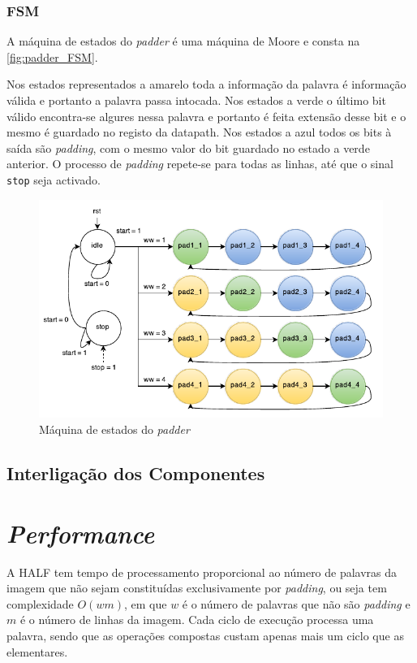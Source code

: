 \documentclass[a4paper]{article}
\begin{document}
\subsubsection{FSM}
A máquina de estados do \textit{padder} é uma máquina de Moore e consta na \autoref{fig:padder_FSM}.

Nos estados representados a amarelo toda a informação da palavra é informação válida e portanto a palavra passa intocada. Nos estados a verde o último bit válido encontra-se algures nessa palavra e portanto é feita extensão desse bit e o mesmo é guardado no registo da datapath. Nos estados a azul todos os bits à saída são \textit{padding}, com o mesmo valor do bit guardado no estado a verde anterior. O processo de \textit{padding} repete-se para todas as linhas, até que o sinal \texttt{stop} seja activado.

\begin{figure}[h]
	\centering
	\includegraphics[width=.9\linewidth]{padder_FSM}
	\caption{Máquina de estados do \textit{padder}}
	\label{fig:padder_FSM}
\end{figure}

\subsection{Interligação dos Componentes}	%

\section{\textit{Performance}}	%

A HALF tem tempo de processamento proporcional ao número de palavras da imagem que não sejam constituídas exclusivamente por \textit{padding}, ou seja tem complexidade $O(w m)$, em que $w$ é o número de palavras que não são \textit{padding} e $m$ é o número de linhas da imagem. Cada ciclo de execução processa uma palavra, sendo que as operações compostas custam apenas mais um ciclo que as elementares.
\end{document}
